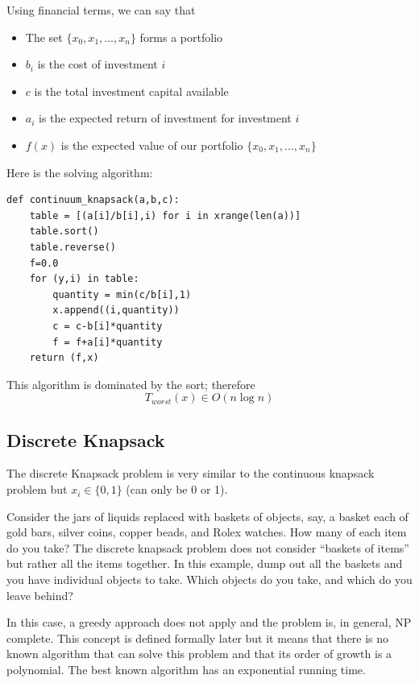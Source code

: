 \documentclass[justified,sixbynine]{tufte-book}
\def\ft{\small\tt}
\theoremstyle{plain}%
\theoremstyle{definition}
\theoremstyle{remark}
\begin{document}
\begin{fullwidth}
Using financial terms, we can say that

\begin{itemize}
\item  The set $\{x_0,x_1,...,x_n\}$ forms a portfolio

\item  $b_i$ is the cost of investment $i$

\item  $c$ is the total investment capital available

\item  $a_i$ is the expected return of investment for investment $i$

\item  $f(x)$ is the expected value of our portfolio $\{x_0,x_1,...,x_n\}$
\end{itemize}

Here is the solving algorithm:

\begin{lstlisting}[caption={in file: {\ft nlib.py}}]
def continuum_knapsack(a,b,c):
    table = [(a[i]/b[i],i) for i in xrange(len(a))]
    table.sort()
    table.reverse()
    f=0.0
    for (y,i) in table:
        quantity = min(c/b[i],1)
        x.append((i,quantity))
        c = c-b[i]*quantity
        f = f+a[i]*quantity
    return (f,x)
\end{lstlisting}

This algorithm is dominated by the sort; therefore
\begin{equation}
T_{worst}(x)\in O(n\log n)
\end{equation}

\subsection{Discrete Knapsack}

The discrete Knapsack problem is very similar to the continuous knapsack
problem but $x_i\in \{0,1\}$ (can only be 0 or 1).

Consider the jars of liquids replaced with baskets of objects, say, a basket each of gold bars, silver coins, copper beads, and Rolex watches.  How many of each item do you take?  The discrete knapsack problem does not consider ``baskets of items'' but rather all the items together.  In this example, dump out all the baskets and you have individual objects to take.  Which objects do you take, and which do you leave behind?

In this case, a greedy approach does not apply and the problem is, in general,
NP complete. This concept is defined formally later but it means that there is no known algorithm that can solve this problem and that its order of growth is a polynomial. The best known algorithm has an exponential running time.


\end{fullwidth}
\end{document}
